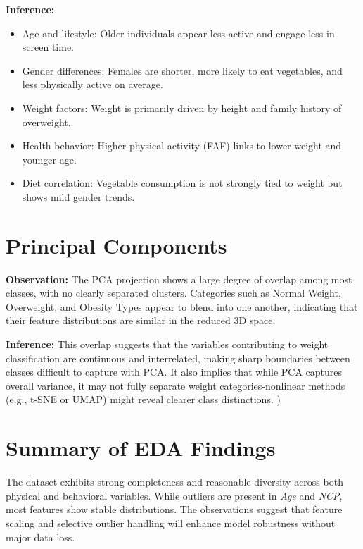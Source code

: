 \textbf{Inference:}
\begin{itemize}
    \item Age and lifestyle: Older individuals appear less active and engage less in screen time.
    \item Gender differences: Females are shorter, more likely to eat vegetables, and less physically active on average.
    \item Weight factors: Weight is primarily driven by height and family history of overweight.
    \item Health behavior: Higher physical activity (FAF) links to lower weight and younger age.
    \item Diet correlation: Vegetable consumption is not strongly tied to weight but shows mild gender trends.
\end{itemize}



\section{Principal Components}\label{sec:principal-components}

\textbf{Observation:}
The PCA projection shows a large degree of overlap among most classes, with no clearly separated clusters.
Categories such as Normal Weight, Overweight, and Obesity Types appear to blend into one another, indicating that their feature distributions are similar in the reduced 3D space.

\textbf{Inference:} This overlap suggests that the variables contributing to weight classification are continuous and interrelated, making sharp boundaries between classes difficult to capture with PCA. It also implies that while PCA captures overall variance, it may not fully separate weight categories-nonlinear methods (e.g., t-SNE or UMAP) might reveal clearer class distinctions.
)


\section*{Summary of EDA Findings}
The dataset exhibits strong completeness and reasonable diversity across both physical and behavioral variables.
While outliers are present in \textit{Age} and \textit{NCP}, most features show stable distributions.
The observations suggest that feature scaling and selective outlier handling will enhance model robustness without major data loss.

